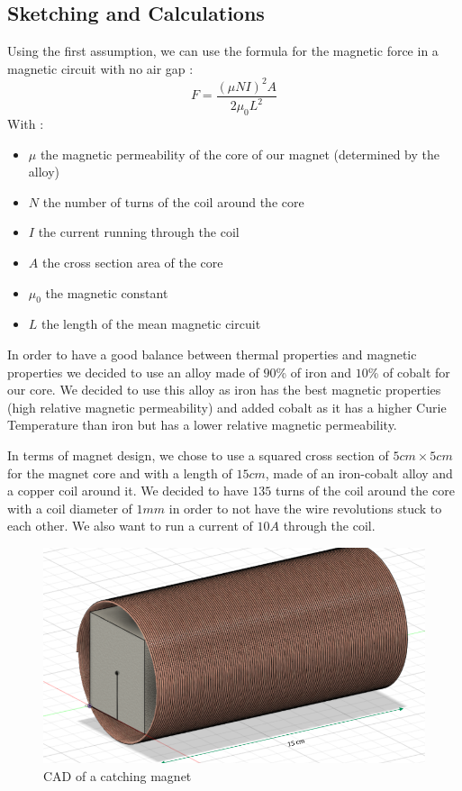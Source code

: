 \subsection{Sketching and Calculations}
Using the first assumption, we can use the formula for the magnetic force in a magnetic circuit with no air gap :
\begin{equation}
F = \frac{(\mu NI)^2 A}{2\mu_0 L^2}
\end{equation}
With : 
\begin{itemize}
	\item $\mu$ the magnetic permeability of the core of our magnet (determined by the alloy)
	\item $N$ the number of turns of the coil around the core
	\item $I$ the current running through the coil
	\item $A$ the cross section area of the core
	\item $\mu_0$ the magnetic constant
	\item $L$ the length of the mean magnetic circuit
\end{itemize}
In order to have a good balance between thermal properties and magnetic properties we decided to use an alloy made of $90$\% of iron and $10$\% of cobalt for our core. We decided to use this alloy as iron has the best magnetic properties (high relative magnetic permeability) and added cobalt as it has a higher Curie Temperature than iron but has a lower relative magnetic permeability.

In terms of magnet design, we chose to use a squared cross section of $5cm\times 5cm$ for the magnet core and with a length of $15cm$, made of an iron-cobalt alloy and a copper coil around it. We decided to have $135$ turns of the coil around the core with a coil diameter of $1mm$ in order to not have the wire revolutions stuck to each other. We also want to run a current of $10A$ through the coil.\\

\begin{figure}[H]
	\centering
	\includegraphics[width=\linewidth]{magnetCAD}
	\caption{CAD of a catching magnet}
\end{figure}


